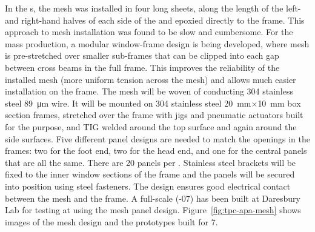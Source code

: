In the  s, the mesh was installed in four long sheets, along the length of the left- and right-hand halves of each side of the  and epoxied directly to the frame. This approach to mesh installation was found to be slow and cumbersome.  For the  mass production, a modular window-frame design is being developed, where mesh is pre-stretched over smaller sub-frames that can be clipped into each gap between cross beams in the full  frame.   This improves the reliability of the installed mesh (more uniform tension across the mesh) and allows much easier installation on the  frame. The mesh will be woven of conducting 304 stainless steel \SI{89}{\um} wire. It will be mounted on 304 stainless steel \SI{20}{mm}$\times$\SI{10}{mm} box section frames,  stretched over the frame with jigs and pneumatic actuators built for the purpose, and TIG welded around the top surface and again around the side surfaces. Five different panel designs are needed to match the openings in the  frames: two for the foot end, two for the head end, and one for the central panels that are all the same. There are 20 panels per . Stainless steel brackets will be fixed to the inner window sections of the  frame and the panels will be secured into position using steel fasteners. The design ensures good electrical contact between the mesh and the frame. A full-scale  (-07) has been built at Daresbury Lab for  testing at  using the mesh panel design. Figure~\ref{fig:tpc-apa-mesh} shows images of the mesh design and the prototypes built for  7.

